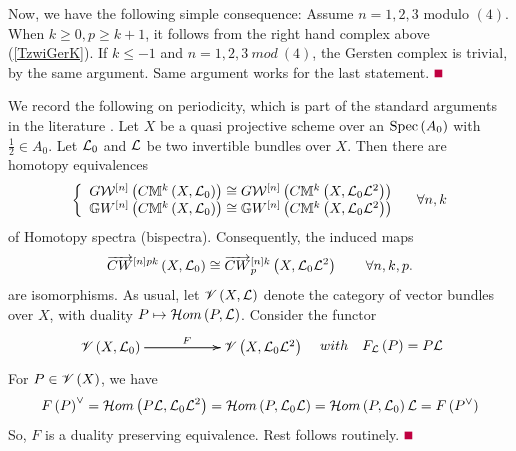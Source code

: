 \documentclass[12pt]{article}
\begin{document}
Now, we have the following simple consequence:
\eP
\pf Assume $n=1, 2, 3$ modulo $(4)$. When $k\geq 0, p\geq k+1$, it follows from the right hand complex above (\ref{TzwiGerK}).
If $k\leq -1$ and $n=1, 2, 3~mod~(4)$, the Gersten complex is trivial, by the same argument. Same argument works for the last statement. \pic $\eop$ 


\vspace{3mm} 
We record the following on periodicity, which is part of the standard arguments in the literature \cite{W3}.
\bP\label{Lsquare}{\rm 
Let $X$ be a quasi projective scheme over an $\spec{A_0}$ with $\frac{1}{2}\in A_0$. 
Let ${\CL}_0$ and ${\CL}$ be two invertible bundles over $X$. Then there are homotopy equivalences
$$
\LBrace{{l} 
G{\CW}^{\LRt{n}}\LRf{C{\BM}^k\LRf{X, {\CL}_0}} \cong G{\CW}^{\LRt{n}}\LRf{C{\BM}^k\LRf{X, {\CL}_0{\CL}^2}}   \\
{\BG}{W}^{\LRt{n}}\LRf{C{\BM}^k\LRf{X, {\CL}_0}} \cong {\BG}{W}^{\LRt{n}}\LRf{C{\BM}^k\LRf{X, {\CL}_0{\CL}^2}}  \\
}\quad \forall n, k
$$
of Homotopy spectra (bispectra).
Consequently, the induced maps
$$
\ora{CW}^{\LRt{n}pk}\LRf{X, {\CL}_0} \cong \ora{CW}^{\LRt{n}k}_p\LRf{X, {\CL}_0{\CL}^2} \qquad  \forall n, k, p.
$$
are isomorphisms. 
}
\eP
\pf As usual, let ${\SV}\LRf{X, {\CL}}$ denote the category of vector bundles over $X$, with duality $P \mapsto {\CH}om\LRf{P, {\CL}}$. Consider the functor 
$$
\diagram
{\SV}\LRf{X, {\CL}_0} \ar[rr]^{F} \ar[rr] && {\SV}\LRf{X, {\CL}_0{\CL}^2}\\
\enddiagram
\quad with \quad F_{{\CL}}\LRf{P} =P {{\CL}}
$$
For $P\in {\SV}\LRf{X}$, we have  
$$
F\LRf{P}^{\vee}=
{\CH}om\LRf{P{\CL}, {\CL}_0{\CL}^2}={\CH}om\LRf{P, {\CL}_0{\CL}}=  {\CH}om\LRf{P, {\CL}_0}{\CL}= F\LRf{P^{\vee}}
$$
So, $F$ is a duality preserving equivalence. Rest follows routinely.
\pic $\eop$
 
\end{document}
